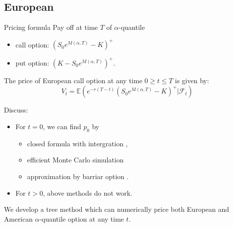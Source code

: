 \documentclass[cjk,10pt]{beamer}
\begin{document}
\subsection{European}
\begin{frame}{Pricing formula}
Pay off at time $T$ of $\alpha$-quantile
\begin{itemize}
\item call option: $(S_0 e^{M(\alpha,T)} - K)^+$
\item put option: $(K - S_0 e^{M(\alpha,T)})^+$.
\end{itemize}

The price of European call option at any time $0\geq t\leq T$ is given by:
\[
V_t = \mathbb{E}\left(e^{-r(T-t)}(S_0 e^{M(\alpha,T)} - K)^+|\mathcal{F}_t\right)
\]

Discuss:\\
\begin{itemize}
\item For $t=0$, we can find $p_0$ by 
  \begin{itemize}
  \item closed formula with intergration \cite{Dassios1995},
  \item  efficient Monte Carlo simulation \cite{Laura2001}
  \item approximation by barriar option \cite{Kwok2001}.
  \end{itemize}
\item For $t> 0$, above methods do not work.  
\end{itemize}

We develop a tree method which can numerically price both European and American 
$\alpha$-quantile option at any time $t$.  
\end{frame}
\end{document}
